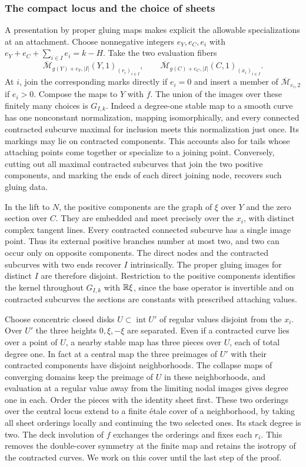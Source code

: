 \subsubsection{The compact locus and the choice of sheets}
A presentation by proper gluing maps makes explicit the allowable
specializations at an attachment. Choose nonnegative integers
$e_Y,e_C,e_i$ with $e_Y+e_C+\sum_{i\in I}e_i=k-H$.
Take the two evaluation fibers
\[
 \overline{\mathcal M}_{g(Y)+e_Y,|I|}(Y,1)_{(r_i)_{i\in I}},
 \qquad
 \overline{\mathcal M}_{g(C)+e_C,|I|}(C,1)_{(x_i)_{i\in I}} .
\]
At $i$, join the corresponding marks directly if $e_i=0$ and
insert a member of $\overline{\mathcal M}_{e_i,2}$ if $e_i>0$.
Compose the maps to $Y$ with $f$. The union of the images over these
finitely many choices is $G_{I,k}$. Indeed a degree-one stable map
to a smooth curve has one nonconstant normalization, mapping
isomorphically, and every connected contracted subcurve maximal for
inclusion meets this normalization just once. Its markings may lie
on contracted components. This accounts also for tails whose attaching
points come together or specialize to a joining point. Conversely,
cutting out all maximal contracted subcurves that join the two
positive components, and marking the ends of each direct joining node,
recovers such gluing data.

In the lift to $N$, the positive components are the graph of $\xi$
over $Y$ and the zero section over $C$. They are embedded and meet
precisely over the $x_i$, with distinct complex tangent lines.
Every contracted connected subcurve has a single image point. Thus
its external positive branches number at most two, and two can occur
only on opposite components. The direct nodes and the contracted
subcurves with two ends recover $I$ intrinsically. The proper gluing
images for distinct $I$ are therefore disjoint. Restriction to the
positive components identifies the kernel throughout $G_{I,k}$ with
$\mathbb R\xi$, since the base operator is invertible and on contracted
subcurves the sections are constants with prescribed attaching values.

Choose concentric closed disks $U\subset\operatorname{int}U'$ of
regular values disjoint from the $x_i$. Over $U'$ the three heights
$0,\xi,-\xi$ are separated. Even if a contracted curve lies over a
point of $U$, a nearby stable map has three pieces over $U$, each of
total degree one. In fact at a central map the three preimages of $U'$
with their contracted components have disjoint neighborhoods. The
collapse maps of converging domains keep the preimage of $U$ in
these neighborhoods, and evaluation at a regular value away from the
limiting nodal images gives degree one in each. Order the pieces with
the identity sheet first. These two orderings over the central locus
extend to a finite étale cover of a neighborhood, by taking all sheet
orderings locally and continuing the two selected ones. Its stack
degree is two. The deck involution of $f$ exchanges the orderings
and fixes each $r_i$. This removes the double-cover symmetry at the
finite map and retains the isotropy of the contracted curves. We work
on this cover until the last step of the proof.

